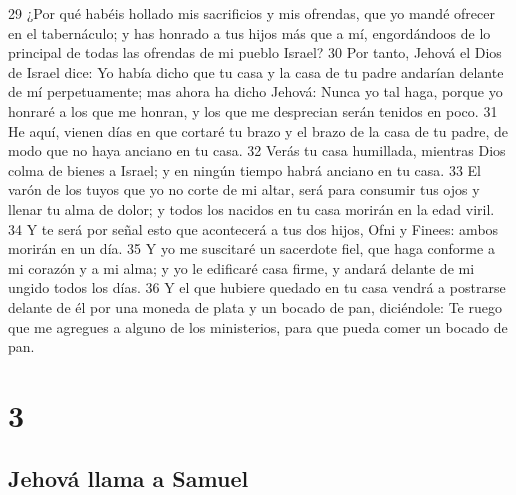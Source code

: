 29 ¿Por qué habéis hollado mis sacrificios y mis ofrendas, que yo mandé ofrecer en el tabernáculo; y has honrado a tus hijos más que a mí, engordándoos de lo principal de todas las ofrendas de mi pueblo Israel?
30 Por tanto, Jehová el Dios de Israel dice: Yo había dicho que tu casa y la casa de tu padre andarían delante de mí perpetuamente; mas ahora ha dicho Jehová: Nunca yo tal haga, porque yo honraré a los que me honran, y los que me desprecian serán tenidos en poco.
31 He aquí, vienen días en que cortaré tu brazo y el brazo de la casa de tu padre, de modo que no haya anciano en tu casa.
32 Verás tu casa humillada, mientras Dios colma de bienes a Israel; y en ningún tiempo habrá anciano en tu casa.
33 El varón de los tuyos que yo no corte de mi altar, será para consumir tus ojos y llenar tu alma de dolor; y todos los nacidos en tu casa morirán en la edad viril.
34 Y te será por señal esto que acontecerá a tus dos hijos, Ofni y Finees: ambos morirán en un día.
35 Y yo me suscitaré un sacerdote fiel, que haga conforme a mi corazón y a mi alma; y yo le edificaré casa firme, y andará delante de mi ungido todos los días.
36 Y el que hubiere quedado en tu casa vendrá a postrarse delante de él por una moneda de plata y un bocado de pan, diciéndole: Te ruego que me agregues a alguno de los ministerios, para que pueda comer un bocado de pan.

\chapter{3}

\section*{Jehová llama a Samuel}


